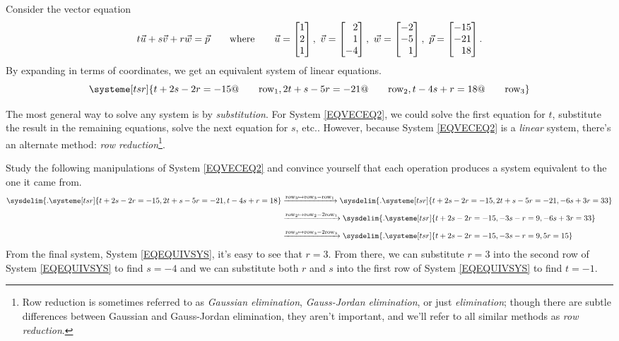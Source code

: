 
	Consider the vector equation
	\[
		t\vec u+s\vec v+r\vec w = \vec p\qquad\text{where}\qquad \vec u=\mat{1\\2\\1},\ 
		\vec v=\mat{2\\1\\-4},\ \vec w=\mat{-2\\-5\\1},\ \vec p=\mat{-15\\-21\\18}.
	\]
	By expanding in terms of coordinates, we get an equivalent system of linear equations.
	\begin{equation}
		\label{EQVECEQ2}
		\systeme[tsr]{
			t+2s-2r=-15@\qquad\text{row}_1,
			2t+s-5r=-21@\qquad\text{row}_2,
			t-4s+r=18@\qquad\text{row}_3
		}
	\end{equation}

	The most general way to solve any system is by \emph{substitution}. For System 
	\eqref{EQVECEQ2}, we could solve the first equation for $t$, substitute the result in
	the remaining equations, solve the next equation for $s$, etc.. However,
	because System \eqref{EQVECEQ2} is a \emph{linear} system, there's an alternate
	method: \emph{row reduction}\footnote{
	Row reduction is sometimes referred to as \emph{Gaussian elimination},
	\emph{Gauss-Jordan elimination}, or just \emph{elimination}; though there are subtle differences between Gaussian
	and Gauss-Jordan elimination,
	they aren't important, and we'll refer to all similar methods as \emph{row reduction}.}.

	Study the following manipulations of System \eqref{EQVECEQ2} and convince yourself
	that each operation produces a system equivalent to the one it came from.
	\begin{align}
	\sysdelim\{.
		\systeme[tsr]{
			t+2s-2r=-15,
			2t+s-5r=-21,
			t-4s+r=18
		}
		&\xrightarrow{\text{row}_3\mapsto\text{row}_3-\text{row}_1}
	\sysdelim\{.
		\systeme[tsr]{
			t+2s-2r=-15,
			2t+s-5r=-21,
			-6s+3r=33
		}\nonumber\\[4pt]
		&\xrightarrow{\text{row}_2\mapsto\text{row}_2-2\text{row}_1}
	\sysdelim\{.
		\systeme[tsr]{
			t+2s-2r=-15,
			-3s-r=9,
			-6s+3r=33
		}\nonumber\\[4pt]
		&\xrightarrow{\text{row}_3\mapsto\text{row}_3-2\text{row}_3}
	\sysdelim\{.
		\systeme[tsr]{
			t+2s-2r=-15,
			-3s-r=9,
			  5r=15
		}\label{EQEQUIVSYS}
	\end{align}
	From the final system, System \eqref{EQEQUIVSYS}, it's easy to see that $r=3$.
	From there,
	we can substitute $r=3$ into the second row of System \eqref{EQEQUIVSYS}
	to find $s=-4$ and we can substitute both $r$ and $s$ into the first row of System \eqref{EQEQUIVSYS}
	to find $t=-1$.

